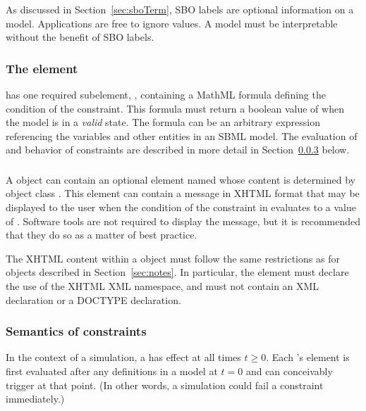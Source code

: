 As discussed in Section~\ref{sec:sboTerm}, SBO labels are optional
information on a model.  Applications are free to ignore
 values.  A model must be interpretable without the
benefit of SBO labels.


\subsubsection{The  element}

\Constraint has one required subelement, ,
containing a MathML formula defining the condition of the
constraint.  This formula must return a boolean value of
 when the model is in a \emph{valid} state.  The formula
can be an arbitrary expression referencing the variables and other
entities in an SBML model.  The evaluation of  and
behavior of constraints are described in more detail in
Section~\ref{sec:constraint-semantics} below.


\subsubsection{}
\label{sec:constraint-message}

A \Constraint object can contain an optional element named
 whose content is determined by object class \Message.
This element can contain a message in XHTML format that may be
displayed to the user when the condition of the constraint in
 evaluates to a value of .  Software tools
are not required to display the message, but it is recommended
that they do so as a matter of best practice.

The XHTML content within a \Message object must follow the same
restrictions as for \Notes objects described in
Section~\ref{sec:notes}.  In particular, the element must declare
the use of the XHTML XML namespace, and must not contain an XML
declaration or a DOCTYPE declaration.


\subsubsection{Semantics of constraints}
\label{sec:constraint-semantics}

In the context of a simulation, a \Constraint has effect at all
times $t \geq 0$.  Each \Constraint's  element is first
evaluated after any \InitialAssignment definitions in a model at
$t = 0$ and can conceivably trigger at that point.  (In other
words, a simulation could fail a constraint immediately.)

